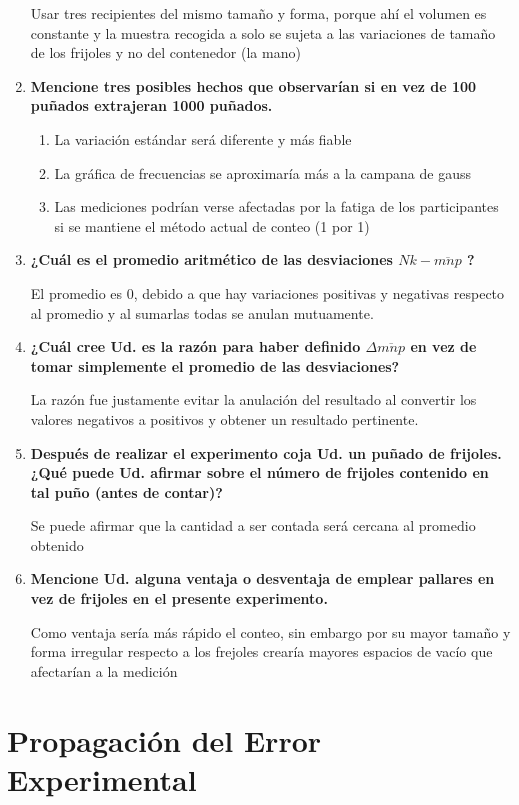 \documentclass[10pt]{article}
\begin{document}
\begin{enumerate}
    Usar tres recipientes del mismo tamaño y forma, porque ahí el volumen es constante y la muestra recogida a solo se sujeta a las variaciones de tamaño de los frijoles y no del contenedor (la mano)
    \item \textbf{Mencione tres posibles hechos que observarían si en vez de 100 puñados
extrajeran 1000 puñados.} 

\begin{enumerate}
    \item  La variación estándar será diferente y más fiable
    \item La gráfica de frecuencias se aproximaría más a la campana de gauss
    \item Las mediciones podrían verse afectadas por la fatiga de los participantes si se mantiene el método actual de conteo (1 por 1)
\end{enumerate}
    \item \textbf{¿Cuál es el promedio aritmético de las desviaciones $Nk - \overline{mnp}$ ?}

    El promedio es 0, debido a que hay variaciones positivas y negativas respecto al promedio y al sumarlas todas se anulan mutuamente.
    \item \textbf{¿Cuál cree Ud. es la razón para haber definido $\Delta \overline{mnp}$ en vez de tomar
simplemente el promedio de las desviaciones?}

    La razón fue justamente evitar la anulación del resultado al convertir los valores negativos a positivos y obtener un resultado pertinente.
    \item \textbf{Después de realizar el experimento coja Ud. un puñado de frijoles. ¿Qué puede
Ud. afirmar sobre el número de frijoles contenido en tal puño (antes de contar)?} 

    Se puede afirmar que la cantidad a ser contada será cercana al promedio obtenido
    \item \textbf{Mencione Ud. alguna ventaja o desventaja de emplear pallares en vez de
frijoles en el presente experimento.}

    Como ventaja sería más rápido el conteo, sin embargo por su mayor tamaño y forma irregular respecto a los frejoles crearía mayores espacios de vacío que afectarían a la medición
\end{enumerate}

\cite{IEEEreferencias:Ref2}

\newpage
\section{Propagaci\'on del Error Experimental}
\end{document}
